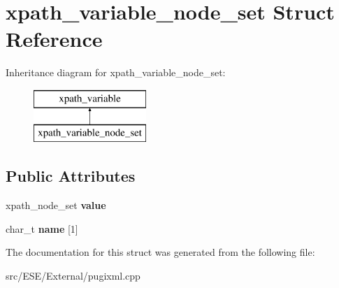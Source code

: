 \hypertarget{structxpath__variable__node__set}{\section{xpath\-\_\-variable\-\_\-node\-\_\-set Struct Reference}
\label{structxpath__variable__node__set}
}
Inheritance diagram for xpath\-\_\-variable\-\_\-node\-\_\-set\-:\begin{figure}[H]
\begin{center}
\leavevmode
\includegraphics[height=2.000000cm]{structxpath__variable__node__set}
\end{center}
\end{figure}
\subsection*{Public Attributes}
\begin{DoxyCompactItemize}
\item 
\hypertarget{structxpath__variable__node__set_a830ac0dbcaf5f8ff3373d10273e72bf4}{xpath\-\_\-node\-\_\-set {\bfseries value}}\label{structxpath__variable__node__set_a830ac0dbcaf5f8ff3373d10273e72bf4}

\item 
\hypertarget{structxpath__variable__node__set_a9a6a40cea40764364adb3ddba2e7a2ff}{char\-\_\-t {\bfseries name} \mbox{[}1\mbox{]}}\label{structxpath__variable__node__set_a9a6a40cea40764364adb3ddba2e7a2ff}

\end{DoxyCompactItemize}


The documentation for this struct was generated from the following file\-:\begin{DoxyCompactItemize}
\item 
src/\-E\-S\-E/\-External/pugixml.\-cpp\end{DoxyCompactItemize}
